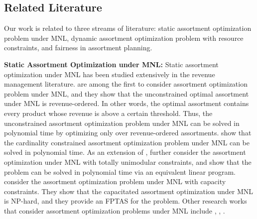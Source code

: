 \documentclass[mnsc,non-blindrev]{informs3}
\theoremstyle{definition}
\begin{document}
\subsection{Related Literature}

Our work is related to three streams of literature: static assortment optimization problem under MNL, dynamic assortment optimization problem with resource constraints, and fairness in assortment planning.

\noindent\textbf{Static Assortment Optimization under MNL:} Static assortment optimization under MNL has been studied extensively in the revenue management literature. \cite{talluri2004revenue} are among the first to consider assortment optimization problem under MNL, and they show that the unconstrained optimal assortment under MNL is revenue-ordered. In other words, the optimal assortment contains every product whose revenue is above a certain threshold. Thus, the unconstrained assortment optimization problem under MNL can be solved in polynomial time by optimizing only over revenue-ordered assortments. \cite{rusmevichientong2010dynamic} show that the cardinality constrained assortment optimization problem under MNL can be solved in polynomial time. As an extension of \cite{rusmevichientong2010dynamic}, \cite{sumida2021revenue} further consider the assortment optimization under MNL with totally unimodular constraints, and show that the problem can be solved in polynomial time via an equivalent linear program. \cite{desir2022capacitated} consider the assortment optimization problem under MNL with capacity constraints. They show that the capacitated assortment optimization under MNL is NP-hard, and they provide an FPTAS for the problem. Other research works that consider assortment optimization problems under MNL include \cite{gao2021assortment}, \cite{el2023joint}, \cite{housni2023maximum}.
\end{document}
